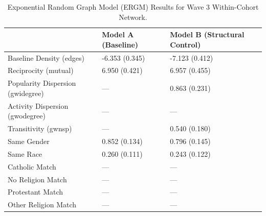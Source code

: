 \begin{table}

\caption{\label{tab:ergms}Exponential Random Graph Model (ERGM) Results for Wave 3 Within-Cohort Network.}
\centering
\begin{tabular}[t]{lll}
\toprule
  & Model A (Baseline) & Model B (Structural Control)\\
\midrule
Baseline Density (edges) & -6.353 (0.345) & -7.123 (0.412)\\
Reciprocity (mutual) & 6.950 (0.421) & 6.957 (0.455)\\
Popularity Dispersion (gwidegree) & --- & 0.863 (0.231)\\
Activity Dispersion (gwodegree) & --- & ---\\
Transitivity (gwnsp) & --- & 0.540 (0.180)\\
\addlinespace
Same Gender & 0.852 (0.134) & 0.796 (0.145)\\
Same Race & 0.260 (0.111) & 0.243 (0.122)\\
Catholic Match & --- & ---\\
No Religion Match & --- & ---\\
Protestant Match & --- & ---\\
\addlinespace
Other Religion Match & --- & ---\\
\bottomrule
\end{tabular}
\end{table}